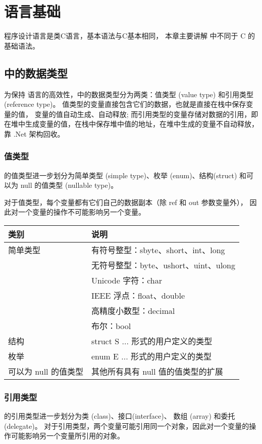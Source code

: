 
\chapter{ \cs 语言基础}

\cs 程序设计语言是类C语言，基本语法与C基本相同， 本章主要讲解 \cs 中不同于 C 的基础语法。

\section{ \cs 中的数据类型}
 为保持 \cs 语言的高效性，\cs 中的数据类型分为两类：值类型 (value type) 和引用类型 (reference type)。
值类型的变量直接包含它们的数据，也就是直接在栈中保存变量的值， 变量的值自动生成、自动释放;
而引用类型的变量存储对数据的引用，即在堆中生成变量的值，在栈中保存堆中值的地址，在堆中生成的变量不自动释放，靠 .Net 架构回收。

\subsection{值类型}
 \cs  的值类型进一步划分为简单类型 (simple type)、枚举 (enum)、结构(struct)
和可以为 null 的值类型 (nullable type)。

对于值类型，每个变量都有它们自己的数据副本（除 ref 和 out 参数变量外），
因此对一个变量的操作不可能影响另一个变量。

\begin{tabular}{|l|l|}
\hline
类别   & 说明 \\
\hline
简单类型   & 有符号整型：sbyte、short、int、long \\
          & 无符号整型：byte、ushort、uint、ulong \\
          & Unicode 字符：char \\
          & IEEE 浮点：float、double \\
          & 高精度小数型：decimal \\
          & 布尔：bool \\
\hline
结构                & struct S {...} 形式的用户定义的类型 \\
枚举                & enum E {...} 形式的用户定义的类型   \\
可以为 null 的值类型 & 其他所有具有 null 值的值类型的扩展   \\
\hline
\end{tabular}


\subsection{引用类型}
 \cs  的引用类型进一步划分为类 (class)、接口(interface)、
数组 (array) 和委托(delegate)。
对于引用类型，两个变量可能引用同一个对象，因此对一个变量的操作可能影响另一个变量所引用的对象。

